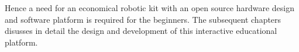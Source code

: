 Hence a need for an economical robotic kit with an open source hardware design and software
platform is required for the beginners. The subsequent chapters disusses in detail the design and development of this interactive educational platform.



 
